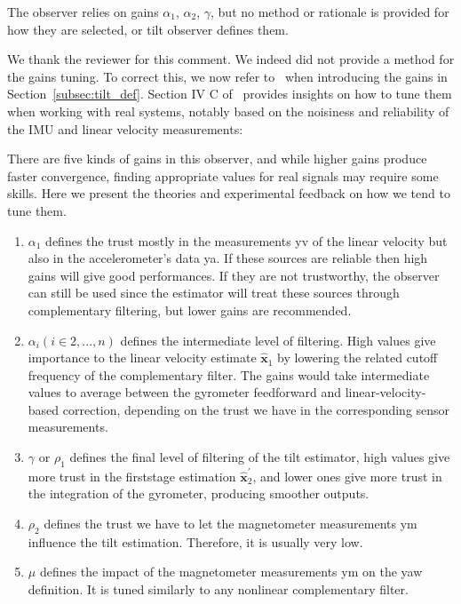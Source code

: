 \begin{revquote}
The observer relies on gains $\alpha_{1}$, $\alpha_{2}$, $\gamma$, but no method or rationale is provided for how they are selected, or tilt observer defines them.
\end{revquote}

We thank the reviewer for this comment. We indeed did not provide a method for the gains tuning. To correct this, we now refer to~\cite{benallegue2023velocity} when introducing the gains in Section~\ref{subsec:tilt_def}. Section IV C of~\cite{benallegue2023velocity} provides insights on how to tune them when working with real systems, notably based on the noisiness and reliability of the IMU and linear velocity measurements:
\begin{quotepaper}
  There are five kinds of gains in this observer, and
while higher gains produce faster convergence, finding
appropriate values for real signals may require some skills.
Here we present the theories and experimental feedback
on how we tend to tune them.
\begin{enumerate}
  \item $\alpha_1$ defines the trust mostly in the measurements yv
of the linear velocity but also in the accelerometer’s
data ya. If these sources are reliable then high
gains will give good performances. If they are not
trustworthy, the observer can still be used since the
estimator will treat these sources through complementary
filtering, but lower gains are recommended.
\item $\alpha_ i  (i \in 2, ..., n)$ defines the intermediate level of
filtering. High values give importance to the linear
velocity estimate $\hat{\boldsymbol{x}}_{1}$ by lowering the related cutoff
frequency of the complementary filter. The gains
would take intermediate values to average between
the gyrometer feedforward and linear-velocity-based
correction, depending on the trust we have in the
corresponding sensor measurements.
\item $\gamma$ or $\rho_1$ defines the final level of filtering of the tilt
estimator, high values give more trust in the firststage
estimation $\hat{\boldsymbol{x}}_{2}^{\prime} $, and lower ones give more trust in
the integration of the gyrometer, producing smoother
outputs.
\item $\rho_2$ defines the trust we have to let the magnetometer
measurements ym influence the tilt estimation.
Therefore, it is usually very low.
\item $\mu$ defines the impact of the magnetometer measurements
ym on the yaw definition. It is tuned similarly
to any nonlinear complementary filter.
\end{enumerate} 

\end{quotepaper}

